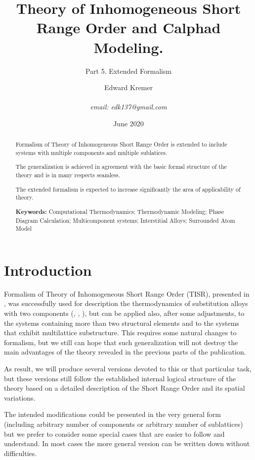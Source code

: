 \documentclass[12pt,abstract]{scrartcl}
\title{Theory of Inhomogeneous Short Range Order and Calphad Modeling. }
\author{Edward Kremer \\ \\ \textit{email: edk137@gmail.com}}
\subtitle{Part 5. Extended Formalism}
\date{June 2020}
\begin{document}
\maketitle

\begin{abstract}

Formalism of Theory of Inhomogeneous Short Range Order is extended to include systems with multiple components and multiple sublatices.

The generalization is achieved in agreement with the basic formal structure of the theory and is  in many respects seamless.

The extended formalism is expected to increase significantly the area of applicability of theory.

\textbf{Keywords:} Computational Thermodynamics;  Thermodynamic Modeling;  Phase Diagram Calculation; Multicomponent systems; Interstitial Alloys; Surrounded Atom Model

\end{abstract}



\section{Introduction}

Formalism of Theory of Inhomogeneous Short Range Order (TISR), presented in \cite{TISR_p1}, was successfully used for description the thermodynamics of substitution  alloys with two components (\cite{TISR_p1}, \cite{TISR_p2},  \cite{TISR_p3}), but can be  applied also, after some adjustments,  to the systems containing  more than two structural elements and  to the systems that exhibit multilattice substructure. 
This requires some natural changes to formalism, but we still can hope that such generalization will not  destroy the main advantages of the theory revealed in the previous parts of the publication.

As  result, we will produce several versions devoted to this or that particular task, but these versions still follow the established internal logical structure of the theory  based on a detailed description of the Short Range Order and its spatial variations.

The intended modifications could be presented in the very general form  (including arbitrary number of components or arbitrary number of sublattices) but we prefer to consider some special cases that are easier to follow and understand.
 In most cases the more general version can be written down without difficulties.
\end{document}
